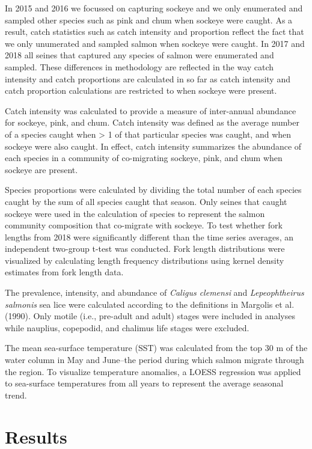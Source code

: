 \documentclass[fleqn,10pt]{wlpeerj} %
\begin{document}
In 2015 and 2016 we focussed on capturing sockeye and we only enumerated and sampled other species such as pink and chum when sockeye were caught. As a result, catch statistics such as catch intensity and proportion reflect the fact that we only unumerated and sampled salmon when sockeye were caught. In 2017 and 2018 all seines that captured any species of salmon were enumerated and sampled. These differences in methodology are reflected in the way catch intensity and catch proportions are calculated in so far as catch intensity and catch proportion calculations are restricted to when sockeye were present.

Catch intensity was calculated to provide a measure of inter-annual abundance for sockeye, pink, and chum. Catch intensity was defined as the average number of a species caught when \textgreater{} 1 of that particular species was caught, and when sockeye were also caught. In effect, catch intensity summarizes the abundance of each species in a community of co-migrating sockeye, pink, and chum when sockeye are present.

Species proportions were calculated by dividing the total number of each species caught by the sum of all species caught that season. Only seines that caught sockeye were used in the calculation of species to represent the salmon community composition that co-migrate with sockeye. To test whether fork lengths from 2018 were significantly different than the time series averages, an independent two-group t-test was conducted. Fork length distributions were visualized by calculating length frequency distributions using kernel density estimates from fork length data.

The prevalence, intensity, and abundance of \emph{Caligus clemensi} and \emph{Lepeophtheirus salmonis} sea lice were calculated according to the definitions in Margolis et al. (1990). Only motile (i.e., pre-adult and adult) stages were included in analyses while nauplius, copepodid, and chalimus life stages were excluded.

The mean sea-surface temperature (SST) was calculated from the top 30 m of the water column in May and June--the period during which salmon migrate through the region. To visualize temperature anomalies, a LOESS regression was applied to sea-surface temperatures from all years to represent the average seasonal trend.

\hypertarget{results}{%
\section{Results}\label{results}}
\end{document}
